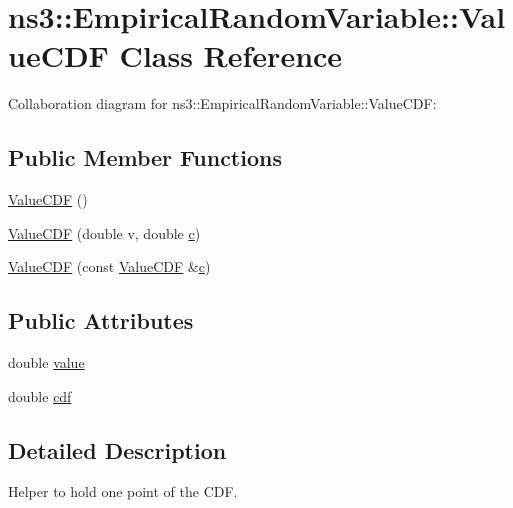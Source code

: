 \hypertarget{classns3_1_1EmpiricalRandomVariable_1_1ValueCDF}{}\section{ns3\+:\+:Empirical\+Random\+Variable\+:\+:Value\+C\+DF Class Reference}
\label{classns3_1_1EmpiricalRandomVariable_1_1ValueCDF}


Collaboration diagram for ns3\+:\+:Empirical\+Random\+Variable\+:\+:Value\+C\+DF\+:
\subsection*{Public Member Functions}
\begin{DoxyCompactItemize}
\item 
\hyperlink{classns3_1_1EmpiricalRandomVariable_1_1ValueCDF_a35e01eaed22be8963a93c9ef1ab4ad82}{Value\+C\+DF} ()
\item 
\hyperlink{classns3_1_1EmpiricalRandomVariable_1_1ValueCDF_a0a4530fe2164c33cf4dfbd332652b3a8}{Value\+C\+DF} (double v, double \hyperlink{mmwave_2model_2fading-traces_2fading__trace__generator_8m_ae0323a9039add2978bf5b49550572c7c}{c})
\item 
\hyperlink{classns3_1_1EmpiricalRandomVariable_1_1ValueCDF_a9ed56062ef723727dead2214d041c0fb}{Value\+C\+DF} (const \hyperlink{classns3_1_1EmpiricalRandomVariable_1_1ValueCDF}{Value\+C\+DF} \&\hyperlink{mmwave_2model_2fading-traces_2fading__trace__generator_8m_ae0323a9039add2978bf5b49550572c7c}{c})
\end{DoxyCompactItemize}
\subsection*{Public Attributes}
\begin{DoxyCompactItemize}
\item 
double \hyperlink{classns3_1_1EmpiricalRandomVariable_1_1ValueCDF_a6fea6513323d037d3d34aac55f5f215c}{value}
\item 
double \hyperlink{classns3_1_1EmpiricalRandomVariable_1_1ValueCDF_a9d26b457d5352c60f5267d08d15c996a}{cdf}
\end{DoxyCompactItemize}


\subsection{Detailed Description}
Helper to hold one point of the C\+DF. 

